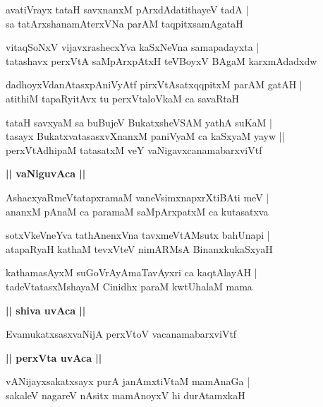 \documentclass[twoside,12pt,openright]{book}
\newcounter{shloka}[chapter]
\def\uvaca#1{\centerline{{\large\textbf{#1}}}}
\begin{document}
\begin{shloka}%
avatiVrayx tataH savxnanxM pArxdAdatithayeV tadA |\\
sa tatArxshanamAterxVNa parAM taqpitxsamAgataH 
\end{shloka}

\begin{shloka}%
vitaqSoNxV vijavxrashecxYva kaSxNeVna samapadayxta |\\
tatashavx perxVtA saMpArxpAtxH teVBoyxV BAgaM karxmAdadxdw 
\end{shloka}

\begin{shloka}%
dadhoyxVdanAtasxpAniVyAtf pirxVtAsatxqqpitxM parAM gatAH |\\
atithiM tapaRyitAvx tu perxVtaloVkaM ca savaRtaH 
\end{shloka}

\begin{shloka}%
tataH savxyaM sa buBujeV BukatxsheVSAM yathA suKaM |\\
tasayx BukatxvatasasxvXnanxM paniVyaM ca kaSxyaM yayw ||\\
perxVtAdhipaM tatasatxM veY vaNigavxcanamabarxviVtf
\end{shloka}

\uvaca{|| vaNiguvAca ||}

\begin{shloka}%
AshacxyaRmeVtatapxramaM vaneVsimxnapxrXtiBAti meV |\\
ananxM pAnaM ca paramaM saMpArxpatxM ca kutasatxva
\end{shloka}

\begin{shloka}%
sotxVkeVneYva tathAnenxVna tavxmeVtAMsutx bahUnapi |\\
atapaRyaH kathaM tevxVteV nimARMsA BinanxkukaSxyaH 
\end{shloka}

\begin{shloka}%
kathamasAyxM suGoVrAyAmaTavAyxri ca kaqtAlayAH |\\
tadeVtatasxMshayaM Cinidhx paraM kwtUhalaM mama 
\end{shloka}

\uvaca{|| shiva uvAca ||}

\begin{shloka}%
EvamukatxsasxvaNijA perxVtoV vacanamabarxviVtf
\end{shloka}

\uvaca{|| perxVta uvAca ||}

\begin{shloka}%
vANijayxsakatxsayx purA janAmxtiVtaM mamAnaGa |\\
sakaleV nagareV nAsitx mamAnoyxV hi durAtamxkaH
\end{shloka}
\end{document}
